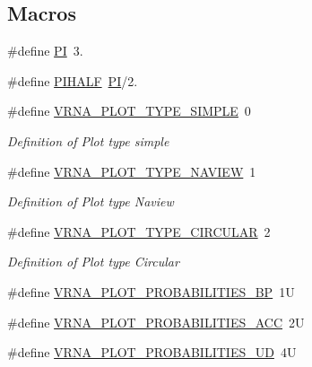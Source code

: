 \subsection*{Macros}
\begin{DoxyCompactItemize}
\item 
\#define \mbox{\hyperlink{group__plotting__utils_ga598a3330b3c21701223ee0ca14316eca}{PI}}~3.
\item 
\#define \mbox{\hyperlink{group__plotting__utils_ga4ffe7c60ebdd6907b33ed6e1808ac465}{P\+I\+H\+A\+LF}}~\mbox{\hyperlink{group__plotting__utils_ga598a3330b3c21701223ee0ca14316eca}{PI}}/2.
\item 
\#define \mbox{\hyperlink{group__plotting__utils_gae6d17b9f0a53cf5205a9181e0f8422e9}{V\+R\+N\+A\+\_\+\+P\+L\+O\+T\+\_\+\+T\+Y\+P\+E\+\_\+\+S\+I\+M\+P\+LE}}~0
\begin{DoxyCompactList}\small\item\em Definition of Plot type {\itshape simple} \end{DoxyCompactList}\item 
\#define \mbox{\hyperlink{group__plotting__utils_ga94d4c863ecac2f220f76658afb92f964}{V\+R\+N\+A\+\_\+\+P\+L\+O\+T\+\_\+\+T\+Y\+P\+E\+\_\+\+N\+A\+V\+I\+EW}}~1
\begin{DoxyCompactList}\small\item\em Definition of Plot type {\itshape Naview} \end{DoxyCompactList}\item 
\#define \mbox{\hyperlink{group__plotting__utils_ga8c9eac631348da92136c8363ecdd9fb9}{V\+R\+N\+A\+\_\+\+P\+L\+O\+T\+\_\+\+T\+Y\+P\+E\+\_\+\+C\+I\+R\+C\+U\+L\+AR}}~2
\begin{DoxyCompactList}\small\item\em Definition of Plot type {\itshape Circular} \end{DoxyCompactList}\item 
\#define \mbox{\hyperlink{group__plotting__utils_gacbb7170d7e64a20671b97dafe3825011}{V\+R\+N\+A\+\_\+\+P\+L\+O\+T\+\_\+\+P\+R\+O\+B\+A\+B\+I\+L\+I\+T\+I\+E\+S\+\_\+\+BP}}~1U
\item 
\#define \mbox{\hyperlink{group__plotting__utils_ga7cf7de27166f5c445e2cf0ffc03b1a7a}{V\+R\+N\+A\+\_\+\+P\+L\+O\+T\+\_\+\+P\+R\+O\+B\+A\+B\+I\+L\+I\+T\+I\+E\+S\+\_\+\+A\+CC}}~2U
\item 
\#define \mbox{\hyperlink{group__plotting__utils_ga7f35d77121d2080b8c172841248b2060}{V\+R\+N\+A\+\_\+\+P\+L\+O\+T\+\_\+\+P\+R\+O\+B\+A\+B\+I\+L\+I\+T\+I\+E\+S\+\_\+\+UD}}~4U
\item 

\end{DoxyCompactItemize}
